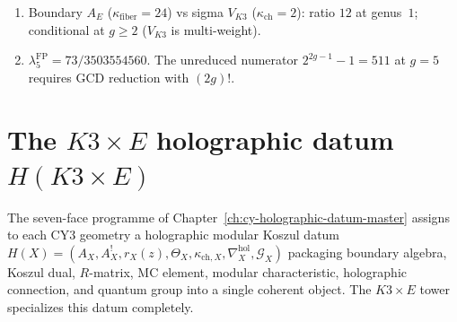 \begin{enumerate}[label=\textup{(K3-\arabic*)}]
\item Boundary $A_E$ ($\kappa_{\mathrm{fiber}} = 24$) vs sigma $V_{K3}$
 ($\kappa_{\mathrm{ch}} = 2$): ratio $12$ at genus~$1$; conditional
 at $g \geq 2$ ($V_{K3}$ is multi-weight).

\item $\lambda_5^{\mathrm{FP}} = 73/3503554560$. The
 unreduced numerator $2^{2g-1} - 1 = 511$ at $g = 5$
 requires GCD reduction with $(2g)!$.
\end{enumerate}

\section{The $K3 \times E$ holographic datum $H(K3 \times E)$}
\label{sec:k3e-holographic-datum}

The seven-face programme of Chapter~\ref{ch:cy-holographic-datum-master}
assigns to each CY3 geometry a holographic modular Koszul datum
$H(X) = (A_X, A_X^!, r_X(z), \Theta_X, \kappa_{\mathrm{ch},X}, \nabla^{\mathrm{hol}}_X, \mathcal{G}_X)$
packaging boundary algebra, Koszul dual, $R$-matrix, MC element,
modular characteristic, holographic connection, and quantum group
into a single coherent object. The $K3 \times E$ tower specializes
this datum completely.

